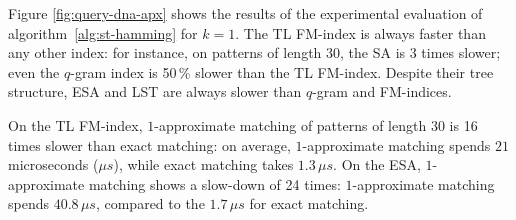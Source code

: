 Figure \ref{fig:query-dna-apx} shows the results of the experimental evaluation of algorithm~\ref{alg:st-hamming} for $k=1$.
The TL FM-index is always faster than any other index: for instance, on patterns of length 30, the SA is 3 times slower; even the $q$-gram index is 50\,\% slower than the TL FM-index.
Despite their tree structure, ESA and LST are always slower than $q$-gram and FM-indices.

On the TL FM-index, $1$-approximate matching of patterns of length 30 is 16 times slower than exact matching: on average, $1$-approximate matching spends $21$ microseconds ($\mu s$), while exact matching takes $1.3 \, \mu s$.
On the ESA, $1$-approximate matching shows a slow-down of 24 times: $1$-approximate matching spends $40.8 \, \mu s$, compared to the $1.7 \, \mu s$ for exact matching.

